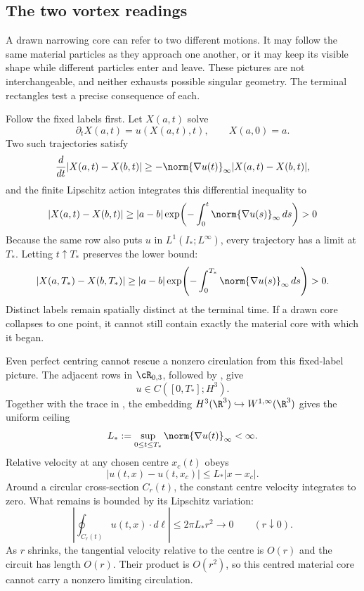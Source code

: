 \subsection{The two vortex readings}\label{sub:ClosingCriticalHeightZenoAndTheVortex}

A drawn narrowing core can refer to two different motions.  It may follow the
same material particles as they approach one another, or it may keep its visible
shape while different particles enter and leave.  These pictures are not
interchangeable, and neither exhausts possible singular geometry.  The
terminal rectangles test a precise consequence of each.

Follow the fixed labels first.
Let \(X(a,t)\) solve
\[
  \partial_tX(a,t)=u(X(a,t),t),
  \qquad
  X(a,0)=a.
\]
Two such trajectories satisfy
\[
  \frac d{dt}|X(a,t)-X(b,t)|
  \geq
  -\norm{\nabla u(t)}_\infty|X(a,t)-X(b,t)|,
\]
and the finite Lipschitz action integrates this differential inequality to
\begin{equation}\label{eq:BodyMaterialCoreLowerBound}
  |X(a,t)-X(b,t)|
  \geq
  |a-b|
  \exp\!\left(
    -\int_0^t\norm{\nabla u(s)}_\infty\,ds
  \right)
  >0
\end{equation}
Because the same row also puts \(u\) in \(L^1(I_*;L^\infty)\), every trajectory
has a limit at \(T_*\).  Letting \(t\uparrow T_*\) preserves the lower bound:
\[
  |X(a,T_*)-X(b,T_*)|
  \geq |a-b|\exp\!\left(-\int_0^{T_*}\norm{\nabla u(s)}_\infty\,ds\right)>0.
\]
Distinct labels remain spatially distinct at the terminal time.
If a drawn core collapses to one point, it cannot still contain exactly the
material core with which it began.

Even perfect centring cannot rescue a nonzero circulation from this fixed-label
picture.  The adjacent rows in \(\cR_{0,3}\), followed by
, give
\[
  u\in C([0,T_*];H^3).
\]
Together with the trace in , the embedding
\(H^3(\R^3)\hookrightarrow W^{1,\infty}(\R^3)\) gives the uniform ceiling
\begin{equation}\label{eq:BodyUniformLipschitzBound}
  L_*:=\sup_{0\leq t\leq T_*}\norm{\nabla u(t)}_\infty<\infty.
\end{equation}
Relative velocity at any chosen centre \(x_c(t)\) obeys
\[
  |u(t,x)-u(t,x_c)|\leq L_*|x-x_c|.
\]
Around a circular cross-section \(C_r(t)\), the constant centre velocity
integrates to zero.  What remains is bounded by its Lipschitz variation:
\begin{equation}\label{eq:BodyCenteredCirculationBound}
  \left|
    \oint_{C_r(t)}u(t,x)\cdot d\ell
  \right|
  \leq2\pi L_*r^2
  \longrightarrow0
  \qquad(r\downarrow0).
\end{equation}
As \(r\) shrinks, the tangential velocity relative to the centre is \(O(r)\)
and the circuit has length \(O(r)\).  Their product is \(O(r^2)\), so this
centred material core cannot carry a nonzero limiting circulation.

